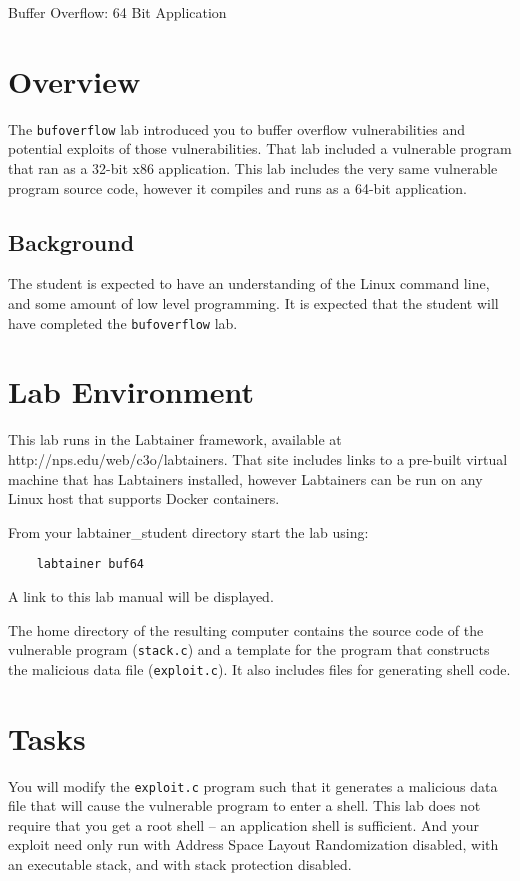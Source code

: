 


\begin{center}
{\LARGE Buffer Overflow: 64 Bit Application}
\vspace{0.1in}\\
\end{center}

\section{Overview}
The {\tt bufoverflow} lab introduced you to buffer overflow vulnerabilities and potential exploits of those
vulnerabilities.  That lab included a vulnerable program that ran as a 32-bit x86 application.  
This lab includes the very same vulnerable program source code, however it compiles and runs as a 64-bit application.

\subsection {Background}
The student is expected to have an understanding of the Linux command line, and some amount of low level programming.
It is expected that the student will have completed the {\tt bufoverflow} lab.

\section{Lab Environment}
\label{environment}
This lab runs in the Labtainer framework,
available at http://nps.edu/web/c3o/labtainers.
That site includes links to a pre-built virtual machine
that has Labtainers installed, however Labtainers can
be run on any Linux host that supports Docker containers.

From your labtainer_student directory start the lab using:
\begin{verbatim}
    labtainer buf64
\end{verbatim}
\noindent A link to this lab manual will be displayed.  

The home directory of the resulting computer contains the source code of the vulnerable program ({\tt stack.c}) and
a template for the program that constructs the malicious data file ({\tt exploit.c}).  It also includes files for generating
shell code.  

\section{Tasks}
You will modify the {\tt exploit.c} program such that it generates a malicious data file that will cause the
vulnerable program to enter a shell.  This lab does not require that you get a root shell -- an application shell
is sufficient.  And your exploit need only run with Address Space Layout Randomization disabled, with an executable
stack, and with stack protection disabled.

